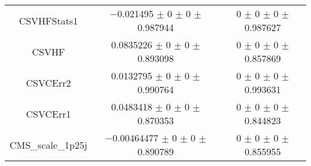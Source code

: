 \begin{table}
\begin{tabular}{ccc}
CSVHFStats1 	& \num{-0.021495} $\pm$ \num{0} $\pm$ \num{0} $\pm$ \num{0.987944} 	& \num{0} $\pm$ \num{0} $\pm$ \num{0} $\pm$ \num{0.987627}\\
CSVHF 	& \num{0.0835226} $\pm$ \num{0} $\pm$ \num{0} $\pm$ \num{0.893098} 	& \num{0} $\pm$ \num{0} $\pm$ \num{0} $\pm$ \num{0.857869}\\
CSVCErr2 	& \num{0.0132795} $\pm$ \num{0} $\pm$ \num{0} $\pm$ \num{0.990764} 	& \num{0} $\pm$ \num{0} $\pm$ \num{0} $\pm$ \num{0.993631}\\
CSVCErr1 	& \num{0.0483418} $\pm$ \num{0} $\pm$ \num{0} $\pm$ \num{0.870353} 	& \num{0} $\pm$ \num{0} $\pm$ \num{0} $\pm$ \num{0.844823}\\
CMS\_scale\_1p25j 	& \num{-0.00464477} $\pm$ \num{0} $\pm$ \num{0} $\pm$ \num{0.890789} 	& \num{0} $\pm$ \num{0} $\pm$ \num{0} $\pm$ \num{0.855955}\\
\bottomrule
\end{tabular}
\end{table}